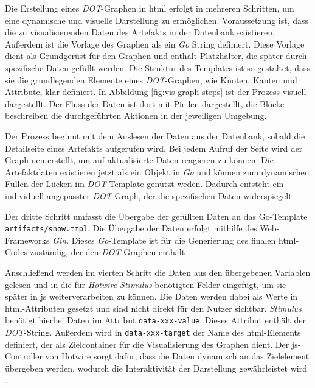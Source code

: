 Die Erstellung eines \textit{DOT}-Graphen in \gls{html} erfolgt in mehreren Schritten, um eine dynamische und visuelle Darstellung zu ermöglichen. Voraussetzung ist, dass die zu visualisierenden Daten des Artefakts in der Datenbank existieren. Außerdem ist die Vorlage des Graphen als ein \textit{Go} String definiert. Diese Vorlage dient als Grundgerüst für den Graphen und enthält Platzhalter, die später durch spezifische Daten gefüllt werden. Die Struktur des Templates ist so gestaltet, dass sie die grundlegenden Elemente eines \textit{DOT}-Graphen, wie Knoten, Kanten und Attribute, klar definiert. In Abbildung \ref{fig:vis-graph-steps} ist der Prozess visuell dargestellt. Der Fluss der Daten ist dort mit Pfeilen dargestellt, die Blöcke beschreiben die durchgeführten Aktionen in der jeweiligen Umgebung.

Der Prozess beginnt mit dem Auslesen der Daten aus der Datenbank, sobald die Detailseite eines Artefakts aufgerufen wird. Bei jedem Aufruf der Seite wird der Graph neu erstellt, um auf aktualisierte Daten reagieren zu können. Die Artefaktdaten existieren jetzt als ein Objekt in \textit{Go} und können zum dynamischen Füllen der Lücken im \textit{DOT}-Template genutzt weden. Dadurch entsteht ein individuell angepasster \textit{DOT}-Graph, der die spezifischen Daten widerspiegelt.

Der dritte Schritt umfasst die Übergabe der gefüllten Daten an das Go-Template \verb|artifacts/show.tmpl|. Die Übergabe der Daten erfolgt mithilfe des Web-Frameworks \textit{Gin}. Dieses \textit{Go}-Template ist für die Generierung des finalen \gls{html}-Codes zuständig, der den \textit{DOT}-Graphen enthält \autocite{GingonicGinGin}.

Anschließend werden im vierten Schritt die Daten aus den übergebenen Variablen gelesen und in die für \textit{Hotwire Stimulus} benötigten Felder eingefügt, um sie später in \gls{js} weiterverarbeiten zu können. Die Daten werden dabei als Werte in \gls{html}-Attributen gesetzt und sind nicht direkt für den Nutzer sichtbar. \textit{Stimulus} benötigt hierbei Daten im Attribut \verb|data-xxx-value|. Dieses Attribut enthält den \textit{DOT}-String. Außerdem wird in \verb|data-xxx-target| der Name des \gls{html}-Elements definiert, der als Zielcontainer für die Visualisierung des Graphen dient. Der \gls{js}-Controller von Hotwire sorgt dafür, dass die Daten dynamisch an das Zielelement übergeben werden, wodurch die Interaktivität der Darstellung gewährleistet wird \autocite{StimulusReference}.

